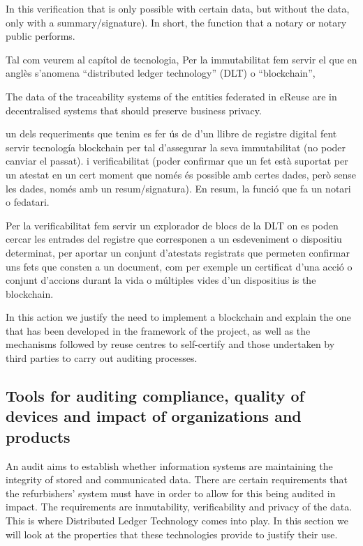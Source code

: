 \documentclass[
]{book}
\begin{document}
In this verification that is only possible with certain data, but without the data, only with a summary/signature). In short, the function that a notary or notary public performs.

Tal com veurem al capítol de tecnologia, Per la immutabilitat fem servir el que en anglès s'anomena ``distributed ledger technology'' (DLT) o ``blockchain'',

The data of the traceability systems of the entities federated in eReuse are in decentralised systems that should preserve business privacy.

un dels requeriments que tenim es fer ús de d'un llibre de registre digital fent servir tecnología blockchain per tal d'assegurar la seva immutabilitat (no poder canviar el passat). i verificabilitat (poder confirmar que un fet està suportat per un atestat en un cert moment que només és possible amb certes dades, però sense les dades, només amb un resum/signatura). En resum, la funció que fa un notari o fedatari.

Per la verificabilitat fem servir un explorador de blocs de la DLT on es poden cercar les entrades del registre que corresponen a un esdeveniment o dispositiu determinat, per aportar un conjunt d'atestats registrats que permeten confirmar uns fets que consten a un document, com per exemple un certificat d'una acció o conjunt d'accions durant la vida o múltiples vides d'un dispositius is the blockchain.

In this action we justify the need to implement a blockchain and explain the one that has been developed in the framework of the project, as well as the mechanisms followed by reuse centres to self-certify and those undertaken by third parties to carry out auditing processes.

\hypertarget{tools-for-auditing-compliance-quality-of-devices-and-impact-of-organizations-and-products}{%
\subsection{Tools for auditing compliance, quality of devices and impact of organizations and products}\label{tools-for-auditing-compliance-quality-of-devices-and-impact-of-organizations-and-products}}

An audit aims to establish whether information systems are maintaining the integrity of stored and communicated data. There are certain requirements that the refurbishers' system must have in order to allow for this being audited in impact. The requirements are inmutability, verificability and privacy of the data. This is where Distributed Ledger Technology comes into play. In this section we will look at the properties that these technologies provide to justify their use.
\end{document}
